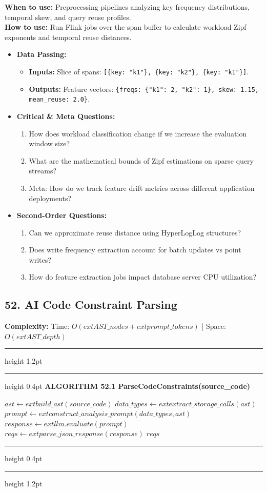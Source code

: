 \documentclass[11pt,a4paper]{article}
\newenvironment{textbookalgo}[2]{%
  \par\addvspace{1.2em}\noindent
  \hrule height 1.2pt
  \vspace{1.5pt}
  \hrule height 0.4pt
  \vspace{5pt}
  {\noindent\large\bfseries\sffamily ALGORITHM #1 \quad #2}
  \par\vspace{5pt}
  \RestyleAlgo{plain}
}{%
  \par\vspace{4pt}
  \hrule height 0.4pt
  \vspace{1.5pt}
  \hrule height 1.2pt
  \par\addvspace{1.2em}
}
\theoremstyle{definition}
\begin{document}
\noindent
\textbf{When to use:} Preprocessing pipelines analyzing key frequency distributions, temporal skew, and query reuse profiles.\\
\textbf{How to use:} Run Flink jobs over the span buffer to calculate workload Zipf exponents and temporal reuse distances.
\begin{itemize}[leftmargin=*]
  \item[] \textbf{Data Passing:}
    \begin{itemize}
      \item \textbf{Inputs:} Slice of spans: \texttt{[\{key: "k1"\}, \{key: "k2"\}, \{key: "k1"\}]}.
      \item \textbf{Outputs:} Feature vectors: \texttt{\{freqs: \{"k1": 2, "k2": 1\}, skew: 1.15, mean\_reuse: 2.0\}}.
    \end{itemize}
  \item[] \textbf{Critical \& Meta Questions:}
  \begin{enumerate}
    \item How does workload classification change if we increase the evaluation window size?
    \item What are the mathematical bounds of Zipf estimations on sparse query streams?
    \item Meta: How do we track feature drift metrics across different application deployments?
  \end{enumerate}
  \item[] \textbf{Second-Order Questions:}
  \begin{enumerate}
    \item Can we approximate reuse distance using HyperLogLog structures?
    \item Does write frequency extraction account for batch updates vs point writes?
    \item How do feature extraction jobs impact database server CPU utilization?
  \end{enumerate}
\end{itemize}
\medskip

\clearpage
\subsection{52. AI Code Constraint Parsing}


\noindent
\textbf{Complexity:} Time: $O(	ext{AST\_nodes} + 	ext{prompt\_tokens})$ | Space: $O(	ext{AST\_depth})$
\smallskip

\begin{textbookalgo}{52.1}{ParseCodeConstraints(source\_code)}
\begin{algorithm}[H]
$ast \leftarrow 	ext{build\_ast}(source\_code)$\;
$data\_types \leftarrow 	ext{extract\_storage\_calls}(ast)$\;
$prompt \leftarrow 	ext{construct\_analysis\_prompt}(data\_types, ast)$\;
$response \leftarrow 	ext{llm.evaluate}(prompt)$\;
$reqs \leftarrow 	ext{parse\_json\_response}(response)$\;
\Return $reqs$\;
\end{algorithm}
\end{textbookalgo}
\end{document}

